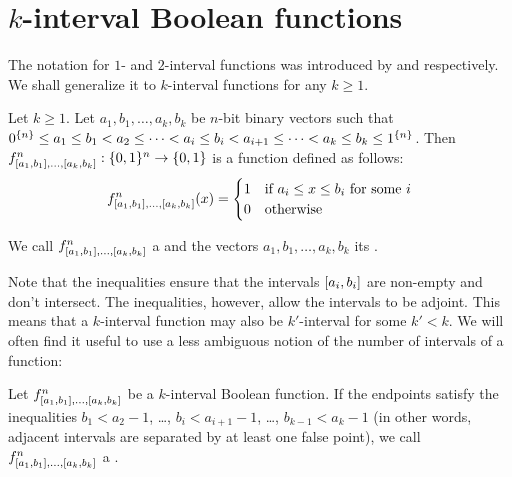 \section{\texorpdfstring{$k$}{k}-interval
Boolean functions}

The notation for $1$- and $2$-interval
functions was introduced by \citeauthor{Schieber2005154} and \citeauthor{Dubovsky2012} respectively.
We shall generalize it to $k$-interval functions for any $k \geq 1$.

\begin{definition}
\label{def:kibf}
Let $k \geq 1$.
Let $a_1, b_1, \ldots, a_k, b_k$ be $n$-bit binary vectors
such that $0^{\{n\}} \leq a_1 \leq b_1 < a_2
\leq \cdots < a_i \leq b_i < a_{i+1}
\leq \cdots < a_k \leq b_k \leq 1^{\{n\}}$.
Then $f^{n}_{[a_1, b_1], \ldots, [a_{k}, b_{k}]}: \{0, 1\}{}^n \rightarrow \{0, 1\}{}$ is a function defined as follows:
$$
f^{n}_{[a_1, b_1], \ldots, [a_{k}, b_{k}]}(x) =
\begin{cases}
1 & \text{if } a_i \leq x \leq b_i \text{ for some } i \\
0 & \text{otherwise}
\end{cases}
$$

We call
$f^n_{[a_1, b_1], \ldots, [a_k, b_k]}$
a 
and the vectors $a_1, b_1, \ldots, a_k, b_k$ its
.
\end{definition}

Note that the inequalities ensure
that the intervals $[a_i, b_i]$
are non-empty and don't intersect.
The inequalities, however, allow the intervals to be adjoint.
This means that a $k$-interval function may also be $k'$-interval for some $k' < k$.
We will often find it useful to use a less ambiguous notion of the number of intervals of a function:

\begin{definition}
\label{def:properkibf}
Let
$f^n_{[a_1, b_1], \ldots, [a_k, b_k]}$
be a $k$-interval Boolean function.
If the endpoints satisfy the inequalities
$b_1 < a_2 - 1$, \ldots, $b_i < a_{i+1} - 1$, \ldots,
$b_{k-1} < a_k - 1$
(in other words, adjacent intervals
are separated by at least one false point),
we call
$f^n_{[a_1, b_1], \ldots, [a_k, b_k]}$
a .
\end{definition}


